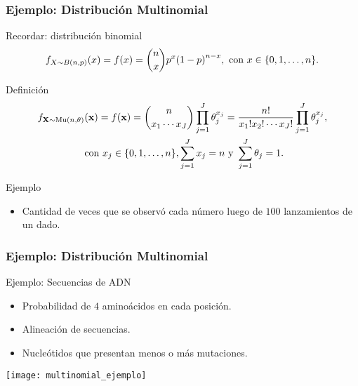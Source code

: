 \documentclass[table]{beamer}
\begin{document}
\begin{frame}
    \frametitle{Ejemplo: Distribución Multinomial}
    \begin{block}{Recordar: distribución binomial}
        \begin{equation*}
            \pff{X \sim \binomial{n}{p}}{x} = \ff{x} = \binom{n}{x} p^{x} \parens{1 - p}^{n - x} , \text{ con } x \in \bparens{0, 1, \ldots , n} .
        \end{equation*}
    \end{block}
    \begin{block}{Definición}
        \begin{multline*}
            \pff{\Xvec \sim \multinomial{n}{\mathbf{\theta}}}{\xvec} = \ff{\xvec} = \binom{n}{x_{1} \cdots x_{J}} \prod_{j = 1}^{J} \theta_{j}^{x_{j}}
            =
            \frac{n !}{x_{1} ! x_{2} ! \cdots x_{J} !} \prod_{j = 1}^{J} \theta_{j}^{x_{j}}
            ,
            \\
            \text{ con } x_{j} \in \bparens{0, 1, \ldots, n} , \sum_{j = 1}^{J} x_{j} = n \text{ y } \sum_{j = 1}^{J} \theta_{j} = 1 .
        \end{multline*}
    \end{block}
    \begin{exampleblock}{Ejemplo}
        \begin{itemize}
            \item Cantidad de veces que se observó cada número luego de $100$ lanzamientos de un dado.
        \end{itemize}
    \end{exampleblock}
\end{frame}

\begin{frame}
    \frametitle{Ejemplo: Distribución Multinomial}
    \begin{exampleblock}{Ejemplo: Secuencias de ADN}
        \begin{itemize}
            \item Probabilidad de $4$ aminoácidos en cada posición.
            \item Alineación de secuencias.
            \item Nucleótidos que presentan menos o más mutaciones.
        \end{itemize}
    \end{exampleblock}
    \begin{center}
        \texttt{[image: multinomial\_ejemplo]}
    \end{center}
\end{frame}
\end{document}
